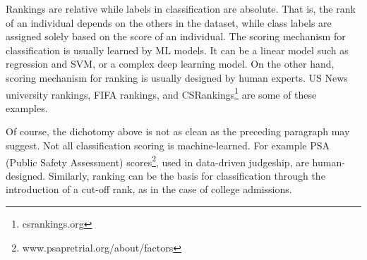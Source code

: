 Rankings are relative while labels in classification are absolute. That is, the rank of an individual depends on the others in the dataset, while class labels are assigned solely based on the score of an individual.
The scoring mechanism for classification is usually learned by ML models. It can be a linear model such as regression and SVM, or a complex deep learning model.  On the other hand, %
scoring mechanism for ranking is usually designed by human experts. US News university rankings, FIFA rankings, and CSRankings\footnote{\small csrankings.org} are some of these examples.

Of course, the dichotomy above is not as clean as the preceding paragraph may suggest. Not all classification scoring is machine-learned. For example PSA (Public Safety Assessment) scores\footnote{\small www.psapretrial.org/about/factors}, used in data-driven judgeship, are human-designed.  Similarly, ranking can be the basis for classification through the introduction of a cut-off rank, as in the case of college admissions.


